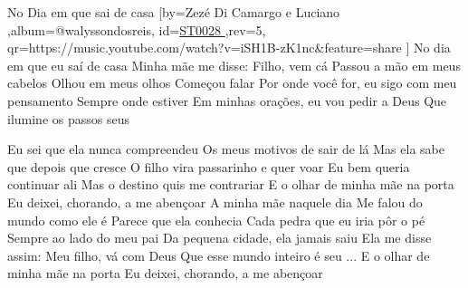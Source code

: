 \beginsong
{No Dia em que sai de casa %
}[by={Zezé Di Camargo e Luciano %
},album={@walyssondosreis},
id={\href{https://music.youtube.com/watch?v=iSH1B-zK1nc&feature=share %
}{ST0028 %
}},rev={5}, %
qr={https://music.youtube.com/watch?v=iSH1B-zK1nc&feature=share %
}]
\beginverse
No dia em que eu saí de casa
Minha mãe me disse: Filho, vem cá
Passou a mão em meus cabelos
Olhou em meus olhos
Começou falar
Por onde você for, eu sigo com meu pensamento
Sempre onde estiver
Em minhas orações, eu vou pedir a Deus
Que ilumine os passos seus 
\endverse

\beginchorus
Eu sei que ela nunca compreendeu
Os meus motivos de sair de lá
Mas ela sabe que depois que cresce
O filho vira passarinho e quer voar 
Eu bem queria continuar ali
Mas o destino quis me contrariar
E o olhar de minha mãe na porta
Eu deixei, chorando, a me abençoar
\endchorus
{}
\beginverse
A minha mãe naquele dia
Me falou do mundo como ele é
Parece que ela conhecia
Cada pedra que eu iria pôr o pé
Sempre ao lado do meu pai
Da pequena cidade, ela jamais saiu
Ela me disse assim: Meu filho, vá com Deus
Que esse mundo inteiro é seu 
\endverse
{}
\beginverse
... E o olhar de minha mãe na porta
Eu deixei, chorando, a me abençoar
\endverse
{}


